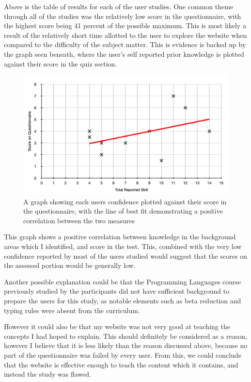 \documentclass{l4proj}
\begin{document}
Above is the table of results for each of the user studies.  One common theme through all of the studies was the relatively low score in the questionnaire, with the highest score being 41 percent of the possible maximum.  This is most likely a result of the relatively short time allotted to the user to explore the website when compared to the difficulty of the subject matter.  This is evidence is backed up by the graph seen beneath, where the user's self reported prior knowledge is plotted against their score in the quiz section.

\begin{figure}[h!]
    \centering
    \includegraphics[width=1\linewidth]{dissertation/images/skill_against_score.png}
    \caption{A graph showing each users confidence plotted against their score in the questionnaire, with the line of best fit demonstrating a positive correlation between the two measures}
    \label{fig:enter-label}
\end{figure}    

This graph shows a positive correlation between knowledge in the background areas which I identified, and score in the test.  This, combined with the very low confidence reported by most of the users studied would suggest that the scores on the assessed portion would be generally low.

Another possible explanation could be that the Programming Languages course previously studied by the participants did not have sufficient background to prepare the users for this study, as notable elements such as beta reduction and typing rules were absent from the curriculum. 

However it could also be that my website was not very good at teaching the concepts I had hoped to explain.  This should definitely be considered as a reason, however I believe that it is less likely than the reason discussed above, because no part of the questionnaire was failed by every user.  From this, we could conclude that the website is effective enough to teach the content which it contains, and instead the study was flawed.
\end{document}
